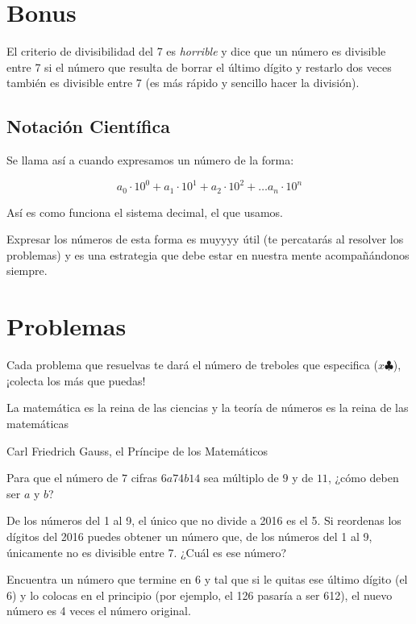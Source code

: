 \section{Bonus}

El criterio de divisibilidad del 7 es \textit{horrible} y dice 
que un número es divisible entre 7 si el número que resulta de 
borrar el último dígito y restarlo dos veces también es 
divisible entre 7 (es más rápido y sencillo hacer la división).

\subsection{Notación Científica}

Se llama así a cuando expresamos un número de la forma:

\[
a_0\cdot 10^0 + a_1\cdot 10^1+a_2\cdot 10^2+\dots a_n\cdot 10^n
\]

Así es como funciona el sistema decimal, el que usamos.

Expresar los números de esta forma es muyyyy útil (te percatarás 
al resolver los problemas) y es una estrategia que debe estar 
en nuestra mente acompañándonos siempre.

\newpage

\section{Problemas}

Cada problema que resuelvas te dará el número de treboles 
que especifica ($x \clubsuit$), ¡colecta los más que puedas!

\epigraph{La matemática es la reina de las ciencias y la teoría de 
números es la reina de las matemáticas}{Carl Friedrich Gauss, el 
Príncipe de los Matemáticos}

\begin{problem}[$2 \clubsuit$]
    Para que el número de $7$ cifras $6a74b14$ sea múltiplo de 
    $9$ y de $11$, ¿cómo deben ser $a$ y $b$? 
\end{problem}

\begin{problem}[$2 \clubsuit$]
    De los números del 1 al 9, el único que no divide a 2016 
    es el 5. Si reordenas los dígitos del 2016 puedes
    obtener un número que, de los números del 1 al 9, únicamente 
    no es divisible entre 7. ¿Cuál es ese número?
\end{problem}

\begin{problem}[$3 \clubsuit$]
    Encuentra un número que termine en 6 y tal que si le 
    quitas ese último dígito (el 6) y lo colocas en el 
    principio (por ejemplo, el 126 pasaría a ser 612), el 
    nuevo número es 4 veces el número original.
\end{problem}


